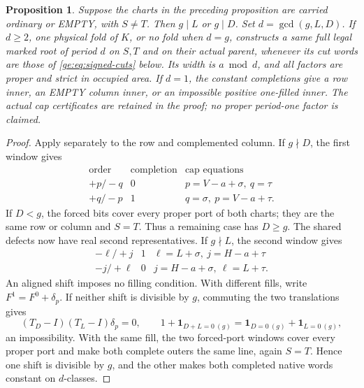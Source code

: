 \documentclass[11pt,a4paper]{amsart}
\numberwithin{equation}{section}
\theoremstyle{plain}
\newtheorem{proposition}[theorem]{Proposition}
\theoremstyle{definition}
\newcommand{\one}{\mathbf1}
\begin{document}
\begin{proposition}\label{ge:carried-signed}
Suppose the charts in the preceding proposition are carried ordinary or
EMPTY, with \(S\ne T\).  Then \(g\mid L\) or \(g\mid D\).  Set
\(d=\gcd(g,L,D)\).  If \(d\ge2\), one physical fold of \(K\), or
no fold when \(d=g\), constructs a same full legal marked root of
period \(d\) on \(S,T\) and on their actual parent, whenever its cut
words are those of \eqref{ge:eq:signed-cuts} below.  Its width is
\(a\bmod d\), and all factors are proper and strict in occupied area.
If \(d=1\), the constant completions give a row inner, an EMPTY column
inner, or an impossible positive one-filled inner.  The actual cap
certificates are retained in the proof; no proper period-one factor is
claimed.
\end{proposition}
\begin{proof}
Apply  separately to the row and complemented column.
If \(g\nmid D\), the first window gives
\[
\begin{array}{c|c|c}
\text{order}&\text{completion}&\text{cap equations}\\ \hline
+p/-q&0&p=V-a+\sigma,\ q=\tau\\
+q/-p&1&q=\sigma,\ p=V-a+\tau.
\end{array}
\]
If \(D<g\), the forced bits cover every proper port of both charts;
they are the same row or column and \(S=T\).  Thus a remaining case
has \(D\ge g\).  The shared defects now have real second
representatives.  If \(g\nmid L\), the second window gives
\[
\begin{array}{c|c|c}
-\ell/+j&1&\ell=L+\sigma,\ j=H-a+\tau\\
-j/+\ell&0&j=H-a+\sigma,\ \ell=L+\tau.
\end{array}
\]
An aligned shift imposes no filling condition.  With different fills,
write \(F^1=F^0+\delta_p\).  If neither shift is divisible by \(g\),
commuting the two translations gives
\[
 (T_D-I)(T_L-I)\delta_p=0,
 \qquad
 1+\one_{D+L=0\ (g)}=\one_{D=0\ (g)}+\one_{L=0\ (g)},
\]
an impossibility.  With the same fill, the two forced-port windows cover
every proper port and make both complete outers the same line, again
\(S=T\).  Hence one shift is divisible by \(g\), and the other makes
both completed native words constant on \(d\)-classes.


\end{proof}
\end{document}
